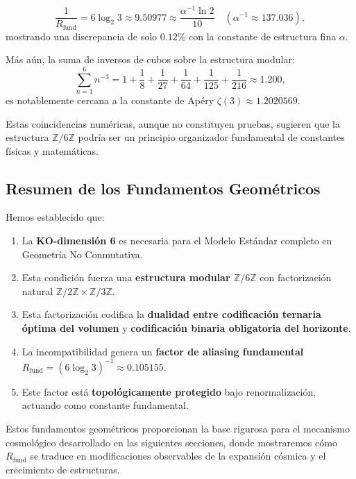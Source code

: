 \documentclass[12pt, a4paper]{article}
\theoremstyle{plain}
\theoremstyle{definition}
\begin{document}
\begin{equation}
\frac{1}{R_{\text{fund}}} = 6\log_2 3 \approx 9.50977 \approx \frac{\alpha^{-1} \ln 2}{10} \quad (\alpha^{-1} \approx 137.036),
\end{equation}
mostrando una discrepancia de solo $0.12\%$ con la constante de estructura fina $\alpha$.

Más aún, la suma de inversos de cubos sobre la estructura modular:
\begin{equation}
\sum_{n=1}^6 n^{-3} = 1 + \frac{1}{8} + \frac{1}{27} + \frac{1}{64} + \frac{1}{125} + \frac{1}{216} \approx 1.200,
\end{equation}
es notablemente cercana a la constante de Apéry $\zeta(3) \approx 1.2020569$.

Estas coincidencias numéricas, aunque no constituyen pruebas, sugieren que la estructura $\mathbb{Z}/6\mathbb{Z}$ podría ser un principio organizador fundamental de constantes físicas y matemáticas.

\subsection{Resumen de los Fundamentos Geométricos}

Hemos establecido que:

\begin{enumerate}
    \item La \textbf{KO-dimensión 6} es necesaria para el Modelo Estándar completo en Geometría No Conmutativa.
    
    \item Esta condición fuerza una \textbf{estructura modular $\mathbb{Z}/6\mathbb{Z}$} con factorización natural $\mathbb{Z}/2\mathbb{Z} \times \mathbb{Z}/3\mathbb{Z}$.
    
    \item Esta factorización codifica la \textbf{dualidad entre codificación ternaria óptima del volumen} y \textbf{codificación binaria obligatoria del horizonte}.
    
    \item La incompatibilidad genera un \textbf{factor de aliasing fundamental} $R_{\text{fund}} = (6\log_2 3)^{-1} \approx 0.105155$.
    
    \item Este factor está \textbf{topológicamente protegido} bajo renormalización, actuando como constante fundamental.
\end{enumerate}

Estos fundamentos geométricos proporcionan la base rigurosa para el mecanismo cosmológico desarrollado en las siguientes secciones, donde mostraremos cómo $R_{\text{fund}}$ se traduce en modificaciones observables de la expansión cósmica y el crecimiento de estructuras.
\end{document}
